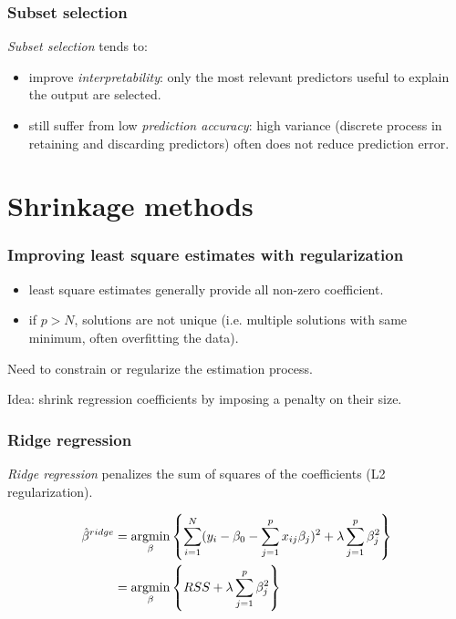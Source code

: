 \documentclass[notes]{beamer}          %
\newcommand{\argmin}{\operatornamewithlimits{argmin}}
\begin{document}
\begin{frame}
\frametitle{Subset selection}

\textit{Subset selection} tends to:

\begin{itemize}
    \item improve \textit{interpretability}: only the most relevant predictors useful to explain the output are selected.
    \item still suffer from  low \textit{prediction accuracy}: high variance (discrete process in retaining and discarding predictors) often does not reduce prediction error.
\end{itemize}

\end{frame}


\section{Shrinkage methods}

\begin{frame}
\frametitle{Improving least square estimates with regularization}
\begin{itemize}
	\item least square estimates generally provide all non-zero coefficient.
	\item if $p>N$, solutions are not unique (i.e. multiple solutions with same minimum, often overfitting the data).
\end{itemize}


\vspace{5mm} 

Need to constrain or regularize the estimation process.

\vspace{5mm} 

Idea: shrink regression coefficients by imposing a penalty on their size.


\end{frame}

\begin{frame}
\frametitle{Ridge regression}
\textit{Ridge regression} penalizes the sum of squares of the coefficients (L2 regularization). 

\begin{align*}
\hat{\beta}^{ridge} &= \argmin_{\beta} \left\{ \sum_{i=1}^N (y_i - \beta_0 -  \sum_{j=1}^p x_{ij}\beta_j)^2 + \lambda \sum_{j=1}^p \beta_j^2 \right\} \\
& =  \argmin_{\beta} \left\{ RSS + \lambda \sum_{j=1}^p \beta_j^2 \right\}
\end{align*}

\end{frame}
\end{document}
